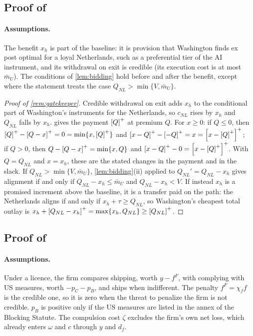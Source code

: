 \subsection{Proof of \texorpdfstring{}{the gatekeeper remark}}

\paragraph{Assumptions.} The benefit $x_h$ is part of the baseline: it is provision that Washington finds ex post optimal for a loyal Netherlands, such as a preferential tier of the AI instrument, and its withdrawal on exit is credible (its execution cost is at most $\bar m_U$). The conditions of \cref{lem:bidding} hold before and after the benefit, except where the statement treats the case $Q_{NL}>\min\{V,\bar m_U\}$.

\begin{proof}[Proof of \cref{rem:gatekeeper}]
Credible withdrawal on exit adds $x_h$ to the conditional part of Washington's instruments for the Netherlands, so $c_{NL}$ rises by $x_h$ and $Q_{NL}$ falls by $x_h$.  gives the payment $\left[Q\right]^{+}$ at premium $Q$. For $x\ge 0$: if $Q\le 0$, then $\left[Q\right]^{+}-\left[Q-x\right]^{+}=0=\min\{x,\left[Q\right]^{+}\}$ and $\left[x-Q\right]^{+}-\left[-Q\right]^{+}=x=\left[x-\left[Q\right]^{+}\right]^{+}$; if $Q>0$, then $Q-\left[Q-x\right]^{+}=\min\{x,Q\}$ and $\left[x-Q\right]^{+}-0=\left[x-\left[Q\right]^{+}\right]^{+}$. With $Q=Q_{NL}$ and $x=x_h$, these are the stated changes in the payment and in the slack. If $Q_{NL}>\min\{V,\bar m_U\}$, \cref{lem:bidding}(ii) applied to $Q_{NL}'=Q_{NL}-x_h$ gives alignment if and only if $Q_{NL}-x_h\le\bar m_U$ and $Q_{NL}-x_h<V$. If instead $x_h$ is a promised increment above the baseline, it is a transfer paid on the path: the Netherlands aligns if and only if $x_h+\tau\ge Q_{NL}$, so Washington's cheapest total outlay is $x_h+\left[Q_{NL}-x_h\right]^{+}=\max\{x_h,Q_{NL}\}\ge\left[Q_{NL}\right]^{+}$.
\end{proof}

\subsection{Proof of \texorpdfstring{}{the firm between jurisdictions}}

\paragraph{Assumptions.} Under a licence, the firm compares shipping, worth $y-f^F$, with complying with US measures, worth $-p_C-p_B$, and ships when indifferent. The penalty $f^F=\chi_f f$ is the credible one, so it is zero when the threat to penalize the firm is not credible. $p_B$ is positive only if the US measures are listed in the annex of the Blocking Statute. The compulsion cost $\zeta$ excludes the firm's own net loss, which already enters $\omega$ and $c$ through $y$ and $d_f$.

